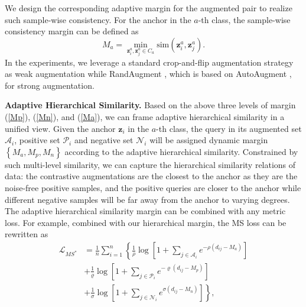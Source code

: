 \documentclass[lettersize,journal]{IEEEtran}
\begin{document}
We design the corresponding adaptive margin for the augmented pair to realize such sample-wise consistency. For the anchor in the $a$-th class, the  sample-wise consistency margin can be defined as 
\begin{equation}
	M_a = \min_{\mathbf{z}^a_i,\mathbf{z}^a_j \in C_a} \text{sim}( \mathbf{z}^a_i , \mathbf{z}^a_j).
	\label{Ma}
\end{equation}
In the experiments, we leverage a  standard crop-and-flip augmentation strategy as weak augmentation while RandAugment \cite{cubuk2020randaugment}, which is based on AutoAugment \cite{cubuk2019autoaugment}, for strong augmentation.

\textbf{Adaptive Hierarchical Similarity.} Based on the above three levels of margin (\ref{Mp}), (\ref{Mn}), and (\ref{Ma}), we can frame adaptive hierarchical similarity in a unified view. Given the anchor $\mathbf{z}_i$ in the $a$-th class, the query in its augmented set $\mathcal{A}_i $, positive set $\mathcal{P}_i$ and negative set $\mathcal{N}_i$ will be assigned dynamic margin $\left\lbrace M_a, M_p, M_n \right\rbrace $ according to the adaptive hierarchical similarity. Constrained by such multi-level similarity, we can capture the hierarchical similarity relations of data: the contrastive augmentations are the closest to the anchor as they are the noise-free positive samples, and the positive queries are closer to the anchor while different negative samples will be far away from the anchor to varying degrees. The adaptive hierarchical similarity margin can be combined with any metric loss. For example,  combined with our hierarchical margin, the MS loss \cite{wang2019multi} can be rewritten as 
\begin{equation}
	\begin{aligned}
		\mathcal{L}_{MS^*}  &=   \frac{1}{n} \sum_{i = 1}^{n}   \left\lbrace  \frac{1}{\rho}  \log   \left[  1  +   \sum_{j \in \mathcal{A}_i}   e^{ - \rho(d_{ij} - M_a)}  \right] \right.\\   
		& +  \frac{1}{\varrho}  \log  \left[  1  +   \sum_{j \in \mathcal{P}_i}   e^{ - \varrho(d_{ij} -  M_p)}  \right]\\
		&+ \left.  \frac{1}{\sigma}  \log  \left[  1  +   \sum_{j \in \mathcal{N}_i}   e^{\sigma(d_{ij} -  M_n)}  \right]\right\rbrace,
	\end{aligned}
	\label{MSn}
\end{equation}
\end{document}
